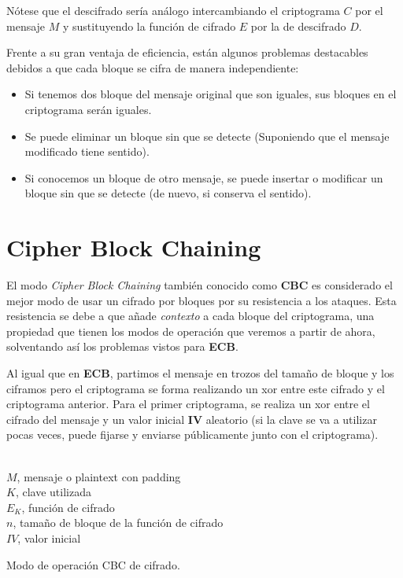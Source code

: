 Nótese que el descifrado sería análogo intercambiando el criptograma $C$ por el mensaje $M$ y sustituyendo la función de cifrado $E$ por la de descifrado $D$.

Frente a su gran ventaja de eficiencia, están algunos problemas destacables debidos a que cada bloque se cifra de manera independiente:
\begin{itemize}
	\item Si tenemos dos bloque del mensaje original que son iguales, sus bloques en el criptograma serán iguales.
	\item Se puede eliminar un bloque sin que se detecte (Suponiendo que el mensaje modificado tiene sentido).
	\item Si conocemos un bloque de otro mensaje, se puede insertar o modificar un bloque sin que se detecte (de nuevo, si conserva el sentido).
\end{itemize}

\section{Cipher Block Chaining}
\label{sec:CBC}
El modo \textit{Cipher Block Chaining} también conocido como \textbf{CBC} es considerado el mejor modo de usar un cifrado por bloques por su resistencia a los ataques. Esta resistencia se debe a que añade \textit{contexto} a cada bloque del criptograma, una propiedad que tienen los modos de operación que veremos a partir de ahora, solventando así los problemas vistos para \textbf{ECB}.

Al igual que en \textbf{ECB}, partimos el mensaje en trozos del tamaño de bloque y los ciframos pero el criptograma se forma realizando un xor entre este cifrado y el criptograma anterior. Para el primer criptograma, se realiza un xor entre el cifrado del mensaje y un valor inicial \textbf{IV} aleatorio (si la clave se va a utilizar pocas veces, puede fijarse y enviarse públicamente junto con el criptograma).

\begin{algorithm}[H]
	\begin{algorithmic}[1]
		\small
		\REQUIRE \ \\
			\texttt{$M$}, mensaje o plaintext con padding\\
			\texttt{$K$}, clave utilizada\\
			\texttt{$E_K$}, función de cifrado\\
			\texttt{$n$}, tamaño de bloque de la función de cifrado\\
			\texttt{$IV$}, valor inicial
		
		\ENDFOR
	\end{algorithmic}

	\caption{Modo de operación CBC de cifrado.}
	\label{alg:CBC}
\end{algorithm}

